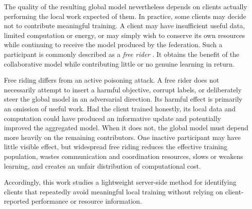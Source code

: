 \documentclass[conference]{IEEEtran}
\begin{document}
The quality of the resulting global model nevertheless depends on clients actually performing the local work expected of them. In practice, some clients may decide not to contribute meaningful training. A client may have insufficient useful data, limited computation or energy, or may simply wish to conserve its own resources while continuing to receive the model produced by the federation. Such a participant is commonly described as a \emph{free rider} \cite{lin2019freeriders,fraboni2021freerider}. It obtains the benefit of the collaborative model while contributing little or no genuine learning in return.

Free riding differs from an active poisoning attack. A free rider does not necessarily attempt to insert a harmful objective, corrupt labels, or deliberately steer the global model in an adversarial direction. Its harmful effect is primarily an omission of useful work. Had the client trained honestly, its local data and computation could have produced an informative update and potentially improved the aggregated model. When it does not, the global model must depend more heavily on the remaining contributors. One inactive participant may have little visible effect, but widespread free riding reduces the effective training population, wastes communication and coordination resources, slows or weakens learning, and creates an unfair distribution of computational cost.

Accordingly, this work studies a lightweight server-side method for identifying clients that repeatedly avoid meaningful local training without relying on client-reported performance or resource information.
\end{document}
